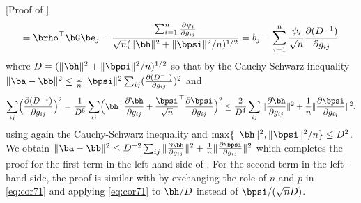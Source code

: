 \documentclass{colt2022} %
\renewenvironment{proof}[1][]
{
    \begin{newproof}
    \ifthenelse{\equal{#1}{}}{ }{\textbf{(#1) }}%
}{
    \end{newproof}
}
\numberwithin{equation}{section}
\begin{document}
\begin{proof} [Proof of ]
$$    =
    \brho^\top\bG\be_j - 
\frac{  
    \sum_{i=1}^n\frac{\partial \psi_i}{\partial g_{ij}}}{\sqrt n (\|\bh\|^2 + \|\bpsi\|^2/n)^{1/2}}
    = b_j
    - \sum_{i=1}^n \frac{\psi_i}{\sqrt n}
    \frac{\partial (D^{-1})}{\partial g_{ij} }
    $$
    where $D=(\|\bh\|^2 + \|\bpsi\|^2/n)^{1/2}$ so that
    by the Cauchy-Schwarz inequality
    $\|\ba-\bb\|^2 \le \frac 1 n \|\bpsi\|^2
    \sum_{ij}(\frac{\partial(D^{-1})}{\partial g_{ij}})^2$
    and
    \begin{equation}
    \sum_{ij}\Bigl(\frac{\partial(D^{-1})}{\partial g_{ij}}\Bigr)^2
    =
    \frac{1}{D^6} \sum_{ij} \Bigl(
      \bh^\top\frac{\partial \bh}{\partial g_{ij}}
      +\frac{\bpsi}{\sqrt n}^\top\frac{\partial \bpsi}{\partial g_{ij}}
    \Bigr)^2
    \le \frac{2}{D^4}
    \sum_{ij} \|\frac{\partial \bh}{\partial g_{ij}}\|^2
    + \frac 1 n \|\frac{\partial \bpsi}{\partial g_{ij}}\|^2
    .
    \label{eq:derivative-D-1}
    \end{equation}
    using again the Cauchy-Schwarz inequality
    and $\max\{\|\bh\|^2,\|\bpsi\|^2/n\}\le D^2$. We obtain
    $\|\ba-\bb\|^2\le D^{-2}
    \sum_{ij} \|\frac{\partial \bh}{\partial g_{ij}}\|^2
    + \frac 1 n \|\frac{\partial \bpsi}{\partial g_{ij}}\|^2$
    which completes the proof for the first term
    in the left-hand side of .
    For the second term in the left-hand side, the proof
    is similar with by exchanging the role of $n$ and $p$
    in \eqref{eq:cor71} and applying
    \eqref{eq:cor71} to $\bh/D$ instead of $\bpsi/(\sqrt n D)$.
\end{proof}
\end{document}
